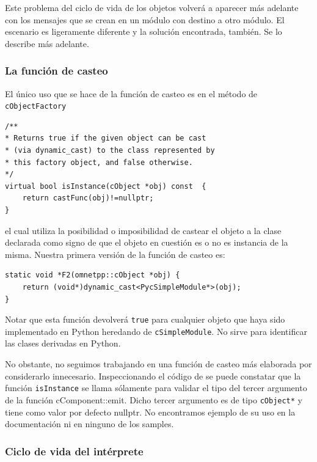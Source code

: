 \documentclass[]{article}
\begin{document}
Este problema del ciclo de vida de los objetos volverá a aparecer más adelante
con los mensajes que se crean en un módulo con destino a otro módulo. El
escenario es ligeramente diferente y la solución encontrada, también. Se lo
describe más adelante.

\subsubsection{La función de casteo}

El único uso que se hace de la función de casteo es en el método de
\verb!cObjectFactory!

\begin{verbatim}
/**
* Returns true if the given object can be cast
* (via dynamic_cast) to the class represented by
* this factory object, and false otherwise.
*/
virtual bool isInstance(cObject *obj) const  {
    return castFunc(obj)!=nullptr;
}
\end{verbatim}

el cual utiliza la posibilidad o imposibilidad de castear el objeto a la clase
declarada como signo de que el objeto en cuestión es o no es instancia de la
misma. Nuestra primera versión de la función de casteo es:

\begin{verbatim}
static void *F2(omnetpp::cObject *obj) {
    return (void*)dynamic_cast<PycSimpleModule*>(obj);
}
\end{verbatim}

Notar que esta función devolverá \verb!true! para cualquier objeto que haya
sido implementado en Python heredando de \verb!cSimpleModule!. No sirve para
identificar las clases derivadas en Python.

No obstante, no seguimos trabajando en una función de casteo más elaborada por
considerarlo innecesario. Inspeccionando el código de \omnetpp{} se puede
constatar que la función \verb!isInstance! se llama sólamente para validar el
tipo del tercer argumento de la función cComponent::emit. Dicho tercer
argumento es de tipo \verb!cObject*! y tiene como valor por defecto nullptr. No
encontramos ejemplo de su uso en la documentación ni en ninguno de los samples.

\subsubsection{Ciclo de vida del intérprete}\label{subsec:interpreterlifecycle}
\end{document}
